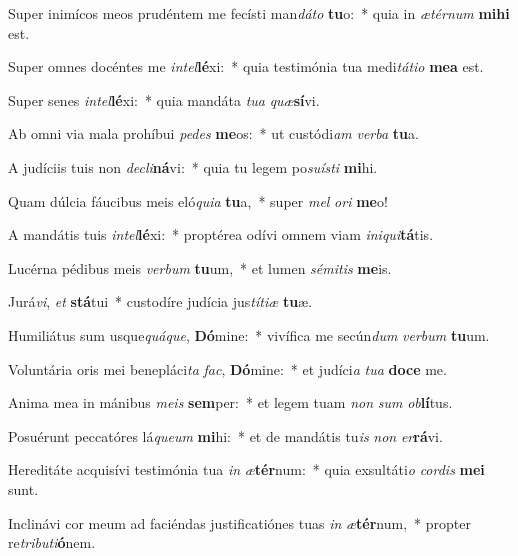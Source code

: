 \item Super inimícos meos prudéntem me fecísti man\textit{dá}\textit{to} \textbf{tu}o:~* quia in \textit{æ}\textit{tér}\textit{num} \textbf{mi}\textbf{hi} est.
\item Super omnes docéntes me \textit{in}\textit{tel}\textbf{lé}xi:~* quia testimónia tua medi\textit{tá}\textit{ti}\textit{o} \textbf{me}\textbf{a} est.
\item Super senes \textit{in}\textit{tel}\textbf{lé}xi:~* quia mandáta \textit{tu}\textit{a} \textit{quæ}\textbf{sí}vi.
\item Ab omni via mala prohíbui \textit{pe}\textit{des} \textbf{me}os:~* ut custódi\textit{am} \textit{ver}\textit{ba} \textbf{tu}a.
\item A judíciis tuis non \textit{de}\textit{cli}\textbf{ná}vi:~* quia tu legem po\textit{su}\textit{ís}\textit{ti} \textbf{mi}hi.
\item Quam dúlcia fáucibus meis eló\textit{qui}\textit{a} \textbf{tu}a,~* super \textit{mel} \textit{o}\textit{ri} \textbf{me}o!
\item A mandátis tuis \textit{in}\textit{tel}\textbf{lé}xi:~* proptérea odívi omnem viam \textit{in}\textit{i}\textit{qui}\textbf{tá}tis.
\item Lucérna pédibus meis \textit{ver}\textit{bum} \textbf{tu}um,~* et lumen \textit{sé}\textit{mi}\textit{tis} \textbf{me}is.
\item Jurá\textit{vi}, \textit{et} \textbf{stá}tui~* custodíre judícia jus\textit{tí}\textit{ti}\textit{æ} \textbf{tu}æ.
\item Humiliátus sum usque\textit{quá}\textit{que}, \textbf{Dó}mine:~* vivífica me secún\textit{dum} \textit{ver}\textit{bum} \textbf{tu}um.
\item Voluntária oris mei benepláci\textit{ta} \textit{fac}, \textbf{Dó}mine:~* et judíci\textit{a} \textit{tu}\textit{a} \textbf{do}\textbf{ce} me.
\item Anima mea in mánibus \textit{me}\textit{is} \textbf{sem}per:~* et legem tuam \textit{non} \textit{sum} \textit{ob}\textbf{lí}tus.
\item Posuérunt peccatóres lá\textit{que}\textit{um} \textbf{mi}hi:~* et de mandátis tu\textit{is} \textit{non} \textit{er}\textbf{rá}vi.
\item Hereditáte acquisívi testimónia tua \textit{in} \textit{æ}\textbf{tér}num:~* quia exsultáti\textit{o} \textit{cor}\textit{dis} \textbf{me}\textbf{i} sunt.
\item Inclinávi cor meum ad faciéndas justificatiónes tuas \textit{in} \textit{æ}\textbf{tér}num,~* propter re\textit{tri}\textit{bu}\textit{ti}\textbf{ó}nem.
